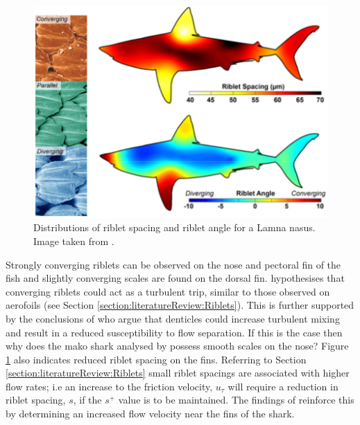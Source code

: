 \documentclass[12pt,oneside,a4paper]{article}
\begin{document}
\begin{figure}[!b]
\centering
\includegraphics[width=0.8\linewidth]{images/litReview/fletcherSharkMorphology.png}
\caption{Distributions of riblet spacing and riblet angle for a Lamna nasus. Image taken from \cite{fletcher2014phd}.}
\label{figure:litReview:fletcherMorphology}
\end{figure}
%
Strongly converging riblets can be observed on the nose and pectoral fin of the fish and slightly converging scales are found on the dorsal fin. \cite{fletcher2014phd} hypothesises that converging riblets could act as a turbulent trip, similar to those observed on aerofoils (see Section \ref{section:literatureReview:Riblets}). This is further supported by the conclusions of \cite{bechert1985} who argue that denticles could increase turbulent mixing and result in a reduced susceptibility to flow separation. If this is the case then why does the mako shark analysed by \cite{diez2015} possess smooth scales on the nose? Figure \ref{figure:litReview:fletcherMorphology} also indicates reduced riblet spacing on the fins. Referring to Section \ref{section:literatureReview:Riblets} small riblet spacings are associated with higher flow rates; i.e an increase to the friction velocity, $u_\tau$ will require a reduction in riblet spacing, $s$, if the $s^+$ value is to be maintained. The findings of \cite{diez2015} reinforce this by determining an increased flow velocity near the fins of the shark. 
\end{document}
